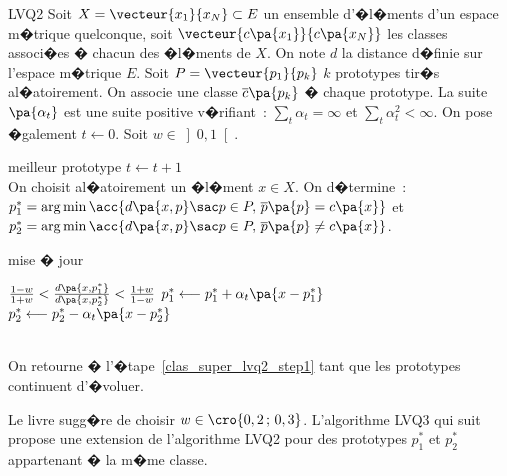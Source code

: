         \begin{xalgorithm}{LVQ2}
        Soit $X = \vecteur{x_1}{x_N} \subset E$ un ensemble d'�l�ments d'un espace m�trique quelconque, 
        soit $\vecteur{c\pa{x_1}}{c\pa{x_N}}$ les classes associ�es � chacun des �l�ments de $X$. On note 
        $d$ la distance d�finie sur l'espace m�trique $E$.
        Soit $P = \vecteur{p_1}{p_k}$ $k$ prototypes tir�s al�atoirement.    
        On associe une classe $\overline{c}\pa{p_k}$ � chaque 
        prototype. La suite $\pa{\alpha_t}$ est une suite positive v�rifiant~: 
        $\sum_t \alpha_t = \infty$ et $\sum_t \alpha_t^2 < \infty$. On pose �galement $t \longleftarrow 0$. 
        Soit $w \in \left]0,1\right[$.

        \begin{xalgostep}{meilleur prototype}\label{clas_super_lvq2_step1}
        $t \longleftarrow t +1$ \\
        On choisit al�atoirement un �l�ment $x \in X$. On d�termine~: \\
        $p^*_1 = \arg \min \acc{ d\pa{x,p} \sac p \in P, \, \overline{p}\pa{p} = c\pa{x} }$ et \\
        $p^*_2 = \arg \min \acc{ d\pa{x,p} \sac p \in P, \, \overline{p}\pa{p} \neq c\pa{x} }$. 
        \end{xalgostep}

        \begin{xalgostep}{mise � jour}
        \begin{xif}{$\frac{1-w}{1+w} < \frac{d\pa{x,p^*_1}}{d\pa{x,p^*_2}} < \frac{1+w}{1-w}$}
            $p^*_1  \longleftarrow p^*_1  + \alpha_t \pa{ x - p^*_1}$ \\
            $p^*_2     \longleftarrow p^*_2  - \alpha_t \pa{ x - p^*_2}$ 
        \end{xif} \\
        On retourne � l'�tape~\ref{clas_super_lvq2_step1} tant que les prototypes continuent d'�voluer.
        \end{xalgostep}
        \end{xalgorithm}
        
        

Le livre  sugg�re de choisir $w \in \cro{0,2 \,;\, 0,3 }$. L'algorithme LVQ3 qui suit propose une extension de l'algorithme LVQ2 pour des prototypes $p^*_1$ et $p^*_2$ appartenant � la m�me classe.

